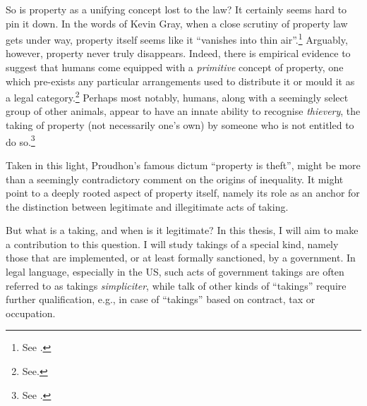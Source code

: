 So is property as a unifying concept lost to the law? It certainly seems hard to pin it down. In the words of Kevin Gray, when a close scrutiny of property law gets under way, property itself seems like it ``vanishes into thin air''.\footnote{See \cite[306-307]{gray91}.} %
Arguably, however, property never truly disappears. Indeed, there is empirical evidence to suggest that humans come equipped with a {\it primitive} concept of property, one which pre-exists any particular arrangements used to distribute it or mould it as a legal category.\footnote{See\cite{stake06}.} Perhaps most notably, humans, along with a seemingly select group of other animals, appear to have an innate ability to recognise {\it thievery}, the taking of property (not necessarily one's own) by someone who is not entitled to do so.\footnote{See \cite[11-13]{brosnan11}.}

Taken in this light, Proudhon's famous dictum ``property is theft'', might be more than a seemingly contradictory comment on the origins of inequality. It might point to a deeply rooted aspect of property itself, namely its role as an anchor for the distinction between legitimate and illegitimate acts of taking.

But what is a taking, and when is it legitimate? In this thesis, I will aim to make a contribution to this question. I will study takings of a special kind, namely those that are implemented, or at least formally sanctioned, by a government. In legal language, especially in the US, such acts of government takings are often referred to as takings {\it simpliciter}, while talk of other kinds of ``takings'' require further qualification, e.g., in case of ``takings'' based on contract, tax or occupation. 

